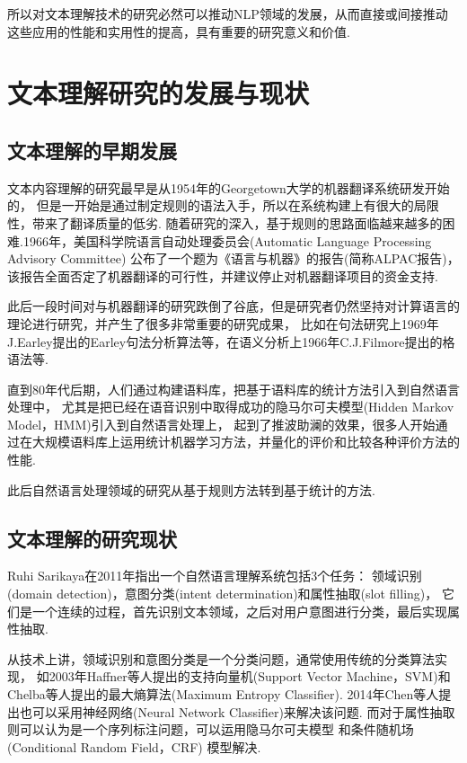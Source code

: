 \documentclass[bachelor,winfonts]{jnuthesis}
\begin{document}
所以对文本理解技术的研究必然可以推动NLP领域的发展，从而直接或间接推动这些应用的性能和实用性的提高，具有重要的研究意义和价值.

\section{文本理解研究的发展与现状}
\subsection{文本理解的早期发展}
文本内容理解的研究最早是从1954年的Georgetown大学的机器翻译系统研发开始的，
但是一开始是通过制定规则的语法入手，所以在系统构建上有很大的局限性，带来了翻译质量的低劣.
随着研究的深入，基于规则的思路面临越来越多的困难.1966年，美国科学院语言自动处理委员会(Automatic Language Processing Advisory Committee)
公布了一个题为《语言与机器》的报告(简称ALPAC报告)，该报告全面否定了机器翻译的可行性，并建议停止对机器翻译项目的资金支持.

此后一段时间对与机器翻译的研究跌倒了谷底，但是研究者仍然坚持对计算语言的理论进行研究，并产生了很多非常重要的研究成果，
比如在句法研究上1969年J.Earley提出的Earley句法分析算法等，在语义分析上1966年C.J.Filmore提出的格语法等.

直到80年代后期，人们通过构建语料库，把基于语料库的统计方法引入到自然语言处理中，
尤其是把已经在语音识别中取得成功的隐马尔可夫模型(Hidden Markov Model，HMM)引入到自然语言处理上，
起到了推波助澜的效果，很多人开始通过在大规模语料库上运用统计机器学习方法，并量化的评价和比较各种评价方法的性能.

此后自然语言处理领域的研究从基于规则方法转到基于统计的方法.

\subsection{文本理解的研究现状}
Ruhi Sarikaya在2011年指出一个自然语言理解系统包括3个任务：
领域识别(domain detection)，意图分类(intent determination)和属性抽取(slot filling)\cite{Deepbelief}，
它们是一个连续的过程，首先识别文本领域，之后对用户意图进行分类，最后实现属性抽取.

从技术上讲，领域识别和意图分类是一个分类问题，通常使用传统的分类算法实现，
如2003年Haffner等人提出的支持向量机(Support Vector Machine，SVM)\cite{SVM}和
Chelba等人提出的最大熵算法(Maximum Entropy Classifier).
2014年Chen等人提出也可以采用神经网络(Neural Network Classifier)来解决该问题.
而对于属性抽取则可以认为是一个序列标注问题，可以运用隐马尔可夫模型
和条件随机场(Conditional Random Field，CRF) 模型解决.
\end{document}
